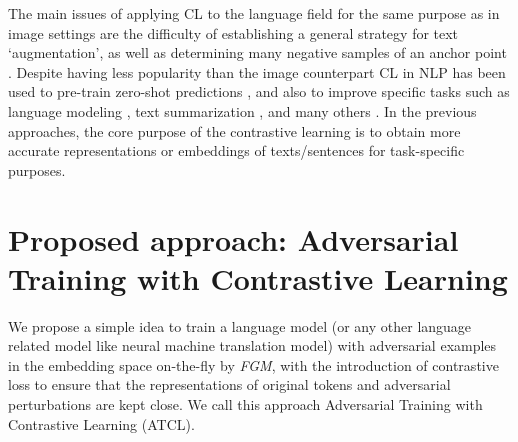 \documentclass[letterpaper]{article} %
\begin{document}
The main issues of applying CL to the language field for the same purpose as in image settings are the difficulty of establishing a general strategy for text `augmentation', as well as determining many negative samples of an anchor point \cite{rethmeier2021primer}. Despite having less popularity than the image counterpart \cite{jaiswal2021survey} CL in NLP has been used to pre-train zero-shot predictions \cite{rethmeier2020long, pappas2019gile}, and also to improve specific tasks such as language modeling \cite{logeswaran2018efficient, giorgi2020declutr}, text summarization \cite{duan2019contrastive}, and many others \cite{rethmeier2021primer}. 
In the previous approaches, the core purpose of the contrastive learning is to obtain more accurate representations or embeddings of texts/sentences for task-specific purposes.


\section{Proposed approach: Adversarial Training with Contrastive Learning} \label{proposed}


We propose a simple idea to train a language model (or any other language related model like neural machine translation model) with adversarial examples in the embedding space on-the-fly by \textit{FGM}, with the introduction of contrastive loss to ensure that the representations of original tokens and adversarial perturbations are kept close. We call this approach Adversarial Training with Contrastive Learning (ATCL).
\end{document}
